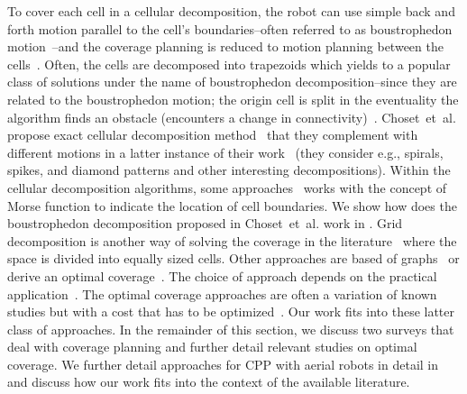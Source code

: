 To cover each cell in a cellular decomposition, the robot can use simple back and forth motion parallel to the cell's boundaries--often referred to as boustrophedon motion~\citep{lavalle2006planning}--and the coverage planning is reduced to motion planning between the cells~\citep{choset2001coverage}. Often, the cells are decomposed into trapezoids which yields to a popular class of solutions under the name of boustrophedon decomposition--since they are related to the boustrophedon motion; the origin cell is split in the eventuality the algorithm finds an obstacle (encounters a change in connectivity)~\citep{choset2000exact}. Choset~et~al. propose exact cellular decomposition method~\citep{choset1998coverage} that they complement with different motions in a latter instance of their work~\citep{choset2000exact} (they consider e.g., spirals, spikes, and diamond patterns and other interesting decompositions). Within the cellular decomposition algorithms, some approaches~\citep{choset2000exact,acar2002morse} works with the concept of Morse function to indicate the location of cell boundaries. We show how does the boustrophedon decomposition proposed in Choset~et~al. work in . Grid decomposition is another way of solving the coverage in the literature~\citep{zelinsky1993planning,gabriely2002spiral,shnaps2016online,wei2018coverage} where the space is divided into equally sized cells. Other approaches are based of graphs~\citep{cheng2019graph} or derive an optimal coverage~\citep{huang2001optimal,xu2011optimal,lee2011smooth,li2011coverage,wei2018coverage}. The choice of approach depends on the practical application~\citep{wei2018coverage}. The optimal coverage approaches are often a variation of known studies but with a cost that has to be optimized~\citep{galceran2013survey}. Our work fits into these latter class of approaches. In the remainder of this section, we discuss two surveys that deal with coverage planning and further detail relevant studies on optimal coverage. We further detail approaches for CPP with aerial robots in detail in  and discuss how our work fits into the context of the available literature.


